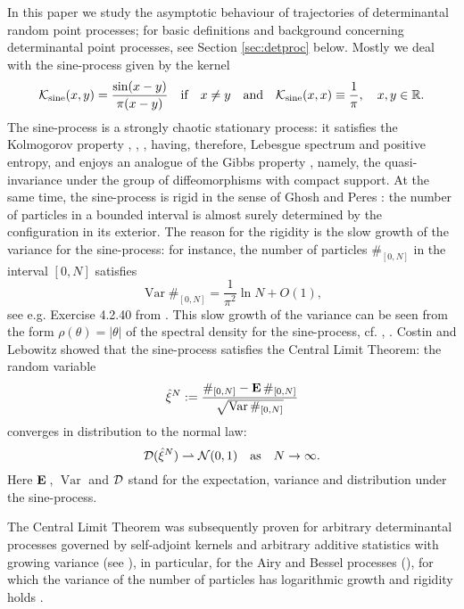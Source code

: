 \documentclass{article}
\numberwithin{equation}{section}
\newcommand{\mR}{\mathbb{R}}
\newcommand{\DD}{{\cal D}}
\newcommand{\NN}{{\cal N}}
\newcommand{\KK}{{\cal K}}
\newcommand{\Var}{\operatorname{Var}}
\newcommand{\MO}{\mbox{\bf E}\,}
\newcommand{\ra}{\rightarrow}
\newcommand{\raw}{\rightharpoonup}
\newcommand{\fr}{\frac}
\newcommand{\qmb}{\quad\mbox}
\newcommand{\qu}{\quad}
\newcommand{\lbl}{\label}
\newcommand{\ass}{\quad\mbox{as}\quad}
\newcommand{\bee}{\begin{equation}}
\newcommand{\eee}{\end{equation}}
\begin{document}
In this paper we
study the asymptotic
behaviour of trajectories
of determinantal random point processes;
for basic definitions and background concerning
determinantal point processes, see Section \ref{sec:detproc} below.
Mostly we deal with the sine-process given by the kernel
\bee\lbl{iKsine}
\KK_{\rm{sine}}(x,y)=\fr{\sin(x-y)}{\pi(x-y)}
\qmb{if}\qu
x\neq y
\qmb{and}\qu
\KK_{\rm{sine}}(x,x)\equiv \fr{1}{\pi}, \qu x,y\in\mR.
\eee
%
The sine-process is a strongly  chaotic stationary process: it satisfies  the Kolmogorov property \cite{Ly}, \cite{BQS}, \cite{OO},   having, therefore, Lebesgue spectrum and positive entropy,   and  enjoys an analogue of
the Gibbs property \cite{Buf14,Buf14a}, namely, the quasi-invariance under the group of diffeomorphisms with compact support.
At the same time, the sine-process is  rigid  in the sense of Ghosh and Peres \cite{G,GP}: the number of particles in a bounded interval is almost surely determined by the configuration in its exterior. The reason for the rigidity is the slow growth of the variance for the sine-process: for instance,  the number of particles $\#_{[0,N]}$
in the interval $[0,N]$ satisfies
\bee\lbl{iVar}
\Var\#_{[0,N]} =\fr{1}{\pi^2} \ln N + O(1),
\eee
see e.g. Exercise 4.2.40 from \cite{AGZ}. This slow growth of the variance
can be  seen from the form $\rho(\theta)=|\theta|$ of the spectral density  for the sine-process, cf. \cite{So00}, \cite{BDQ}.
  Costin and Lebowitz \cite{CL} showed
that the sine-process
satisfies the Central Limit Theorem: 
 the random variable
\bee\lbl{ixi}
\hat\xi^N:=\fr{\#_{[0,N]}-\MO \#_{[0,N]}}{\sqrt{\Var\#_{[0,N]}}}
\eee
converges in distribution to the normal law:
\bee\lbl{iCLT}
\DD(\hat\xi^N)\raw \NN(0,1) \ass N\ra\infty.
\eee
Here $\MO$, $\Var$ and $\DD$
stand for the expectation, variance and distribution under the sine-process.

The Central Limit Theorem was subsequently proven
for arbitrary determinantal processes governed by self-adjoint kernels and arbitrary additive statistics with growing variance 
(see \cite{So00,SoAB,So00b,So01, HKPV}),
in particular, for the Airy and Bessel processes (\cite{SoAB}),
for which the variance  of the number of particles has logarithmic growth and rigidity  holds \cite{Buf16}.
\end{document}
